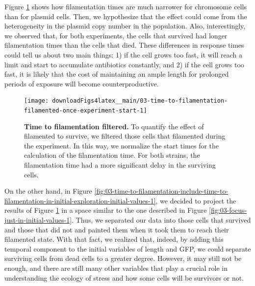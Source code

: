 \documentclass[a4paper, nobind]{templates/ociamthesis}
\begin{document}
Figure \ref{fig:03-time-to-filamentation-filamented-once-experiment-start-1} shows how filamentation times are much narrower for chromosome cells than for plasmid cells.
Then, we hypothesize that the effect could come from the heterogeneity in the plasmid copy number in the population.
Also, interestingly, we observed that, for both experiments, the cells that survived had longer filamentation times than the cells that died.
These differences in response times could tell us about two main things: 1) if the cell grows too fast, it will reach a limit and start to accumulate antibiotics constantly, and 2) if the cell grows too fast, it is likely that the cost of maintaining an ample length for prolonged periods of exposure will become counterproductive.





\begin{figure}[H]
\texttt{[image: downloadFigs4latex\_\_main/03-time-to-filamentation-filamented-once-experiment-start-1]} \caption[Time to filamentation filtered.]{\textbf{Time to filamentation filtered.} To quantify the effect of filamented to survive, we filtered those cells that filamented during the experiment. In this way, we normalize the start times for the calculation of the filamentation time. For both strains, the filamentation time had a more significant delay in the surviving cells.}\label{fig:03-time-to-filamentation-filamented-once-experiment-start-1}
\end{figure}

On the other hand, in Figure \ref{fig:03-time-to-filamentation-include-time-to-filamentation-in-initial-exploration-initial-values-1}, we decided to project the results of Figure \ref{fig:03-time-to-filamentation-filamented-once-experiment-start-1} in a space similar to the one described in Figure \ref{fig:03-focus-just-in-initial-values-1}.
Thus, we separated our data into those cells that survived and those that did not and painted them when it took them to reach their filamented state.
With that fact, we realized that, indeed, by adding this temporal component to the initial variables of length and GFP, we could separate surviving cells from dead cells to a greater degree.
However, it may still not be enough, and there are still many other variables that play a crucial role in understanding the ecology of stress and how some cells will be survivors or not.
\end{document}
